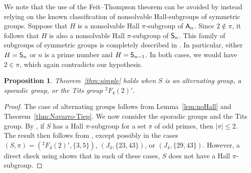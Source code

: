 \documentclass[12pt]{amsart}
\newtheorem{proposition}[theorem]{Proposition}
\theoremstyle{definition}
\numberwithin{equation}{section}
\newcommand{\Irr}{{\mathrm {Irr}}}
\newcommand{\QQ}{{\mathbb Q}}
\newcommand{\ZZ}{{\mathbb Z}}
\newcommand{\Al}{\textup{\textsf{A}}}
\newcommand{\Sy}{\textup{\textsf{S}}}
\begin{document}
We note that the use of the Feit--Thompson theorem can be avoided by
instead relying on the known classification %
of nonsolvable Hall-subgroups of %
symmetric groups. Suppose that $H$ is %
a nonsolvable
Hall $\pi$-subgroup %
of $\Al_n$. Since $2 \notin \pi$, it follows
that $H$ is also %
a nonsolvable Hall %
$\pi$-subgroup of $\Sy_n$. This
family of subgroups of symmetric groups is completely described in
\cite{Thompson}. In particular, either $H = \Sy_n$ or $n$ is a prime
number and $H = \Sy_{n-1}$. In both cases, we would have $2 \in
\pi$, which again contradicts our hypothesis.



\begin{proposition}\label{prop:alternatingandsporadic}
Theorem~\ref{thm:simple} holds %
when $S$ is an alternating group, a
sporadic group, or the Tits group ${}^2F_4(2)'$.
\end{proposition}

\begin{proof}
The case of alternating groups follows from Lemma~\ref{lem:noHall}
and Theorem~\ref{thm:Navarro-Tiep}. We now consider the sporadic
groups and the Tits group. By \cite[Theorem~6.14]{G86}, if $S$ has a
Hall $\pi$-subgroup for a set $\pi$ of odd primes, then $|\pi| \le
2$. The result then follows from \cite[Theorem~2.1]{GHSV21}, except
possibly in the cases $(S,\pi)=({}^2F_4(2)',\{3,5\})$, $(J_4,
\{23,43\})$, or $(J_4,\{29,43\})$. However, a direct check using
\cite{Atl1} shows that in each of these cases, $S$ does not have a
Hall $\pi$-subgroup.
\end{proof}
\end{document}
